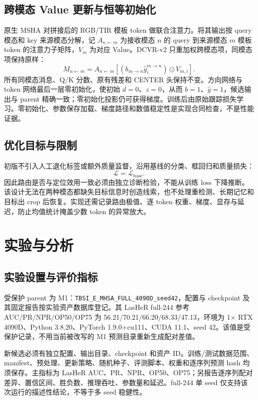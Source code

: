 \documentclass[journal]{IEEEtran}
\begin{document}
\subsection{跨模态 Value 更新与恒等初始化}
原生 MSHA 对拼接后的 RGB/TIR 模板 token 做联合注意力。将其输出按 query 模态和 key 来源模态分解，记 $A_{n\leftarrow m}$ 为接收模态 $n$ 的 query 到来源模态 $m$ 模板 token 的注意力子矩阵，$V_m$ 为对应 Value。DCVR-v2 只重加权跨模态项，同模态项保持原样：
\begin{equation}
 M_{n\leftarrow m}=A_{n\leftarrow m}
 \left[(b_{m\rightarrow n}\hat g_i^{m\rightarrow n})\odot V_{m,i}\right].
\end{equation}
所有同模态消息、Q/K 分数、原有残差和 CENTER 头保持不变。方向网络与 token 网络最后一层零初始化，使初始 $d=0$、$z=0$，从而 $b=1$、$\hat g=1$，候选输出与 parent 精确一致；零初始化投影仍可获得梯度。训练后由原始跟踪损失学习。零初始化、参数保存加载、梯度路径和数值稳定性是实现合同检查，不是性能证据。

\subsection{优化目标与限制}
初版不引入人工退化标签或额外质量监督，沿用基线的分类、框回归和质量损失：
\begin{equation}
 \mathcal{L}=\mathcal{L}_{\mathrm{base}}.
\end{equation}
因此路由是否与定位效用一致必须由独立诊断检验，不能从训练 loss 下降推断。该设计无法在两种模态都缺失目标信息时创造线索，也不处理重检测、长期记忆和目标出 crop 后恢复。实现还需记录路由极值、逐 token 权重、梯度、显存与延迟，防止均值统计掩盖少数 token 的异常放大。

\section{实验与分析}

\subsection{实验设置与评价指标}
受保护 parent 为 M1：\texttt{TBSI\_E\_MHSA\_FULL\_4090D\_seed42}，配置与 checkpoint 及其固定报告按实验资产数据库登记。其 LasHeR full-244 参考 AUC/PR/NPR/OP50/OP75 为 56.21/70.21/66.20/68.33/47.13，环境为 1$\times$ RTX 4090D、Python 3.8.20、PyTorch 1.9.0+cu111、CUDA 11.1、seed 42。该值是受保护记录，不用当前被改写的 M1 预测目录重新生成配对差值。

新候选必须有独立配置、输出目录、checkpoint 和资产 ID。训练/测试数据范围、manifest、预处理、更新策略、随机种子、评测脚本、权重和逐序列预测 hash 均须保存。主指标为 LasHeR AUC、PR、NPR、OP50、OP75；另报告逐序列配对差异、置信区间、胜负数、推理吞吐、参数量和延迟。full-244 单 seed 仅支持该次运行的描述性结论，不等于多 seed 稳健性。
\end{document}

